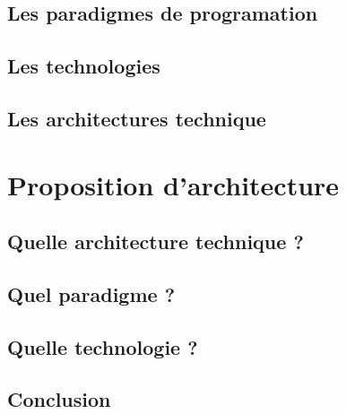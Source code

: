 \documentclass[twoside, 12pt]{report}
\begin{document}
        \section{Les paradigmes de programation}
        
        \section{Les technologies}
        
        \section{Les architectures technique}
        
    \chapter{Proposition d'architecture}
    
    	\section{Quelle architecture technique ?}
    
    	\section{Quel paradigme ?}
        
        \section{Quelle technologie ?}



\cleardoublepage
\vfill

\section*{\textbf{Conclusion}}
\label{sect:Conclusion}




%
\end{document}
